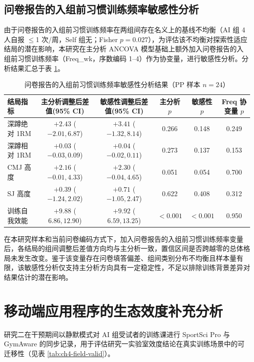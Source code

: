 \documentclass[UTF8,zihao=-4,twoside,openany]{ctexbook}
\begin{document}
\subsection{问卷报告的入组前习惯训练频率敏感性分析}
由于问卷报告的入组前习惯训练频率在两组间存在名义上的基线不均衡（AI 组 4 人自报 $\le$1 次/周，Self 组无；Fisher $p = 0.027$），为评估该不均衡对探索性适应结局的潜在影响，本研究在主分析 ANCOVA 模型基础上额外加入问卷报告的入组前习惯训练频率（Freq\_wk，序数编码 1--4）作为协变量，进行敏感性分析。分析结果汇总于表 \ref{tab:ch4-freq-sens}。

\begin{table}[htbp]
  \centering
  \caption{问卷报告的入组前习惯训练频率敏感性分析结果（PP 样本 $n=24$）}
  \label{tab:ch4-freq-sens}
  \vspace{6pt}
  \small
  \begin{tabularx}{\textwidth}{lccccc}
    \toprule
    \textbf{结局指标} & \textbf{主分析调整后差值(95\% CI)} & \textbf{敏感性调整后差值(95\% CI)} & \textbf{主分析 $p$} & \textbf{敏感性 $p$} & \textbf{Freq 协变量 $p$} \\
    \midrule
    深蹲绝对 1RM & $+2.43$ ($-2.01, 6.87$) & $+3.41$ ($-1.32, 8.14$) & 0.266 & 0.148 & 0.249 \\
    深蹲相对 1RM & $+0.03$ ($-0.03, 0.09$) & $+0.04$ ($-0.02, 0.11$) & 0.273 & 0.137 & 0.153 \\
    CMJ 高度 & $+2.16$ ($-0.01, 4.33$) & $+2.30$ ($-0.04, 4.65$) & 0.051 & 0.054 & 0.700 \\
    SJ 高度 & $+0.39$ ($-1.24, 2.02$) & $+0.71$ ($-1.05, 2.47$) & 0.622 & 0.408 & 0.312 \\
    训练自我效能 & $+9.88$ ($6.86, 12.90$) & $+9.92$ ($6.59, 13.25$) & $<0.001$ & $<0.001$ & 0.950 \\
    \bottomrule
  \end{tabularx}
\end{table}

在本研究样本和当前问卷编码方式下，加入问卷报告的入组前习惯训练频率变量后，各结局的组间调整后差值方向均与主分析一致，置信区间是否跨越零的总体格局未发生改变。鉴于该变量存在问卷填答偏差、组间类别分布不均衡且样本量有限，该敏感性分析仅支持主分析方向具有一定稳定性，不足以排除训练背景差异对结果估计的潜在影响。

\section{移动端应用程序的生态效度补充分析}
研究二在干预期间以静默模式对 AI 组受试者的训练课进行 SportSci Pro 与 GymAware 的同步记录，用于评估研究一实验室效度结论在真实训练场景中的可迁移性（见表 \ref{tab:ch4-field-valid}）。
\end{document}
